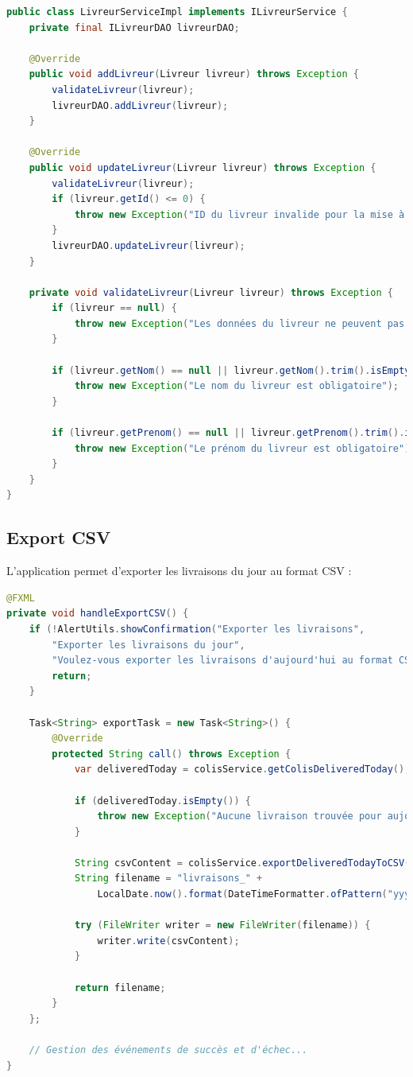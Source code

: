\documentclass{rapportENSIAS}
\begin{document}
\begin{lstlisting}[language=Java, caption=Service Livreur]
public class LivreurServiceImpl implements ILivreurService {
    private final ILivreurDAO livreurDAO;
    
    @Override
    public void addLivreur(Livreur livreur) throws Exception {
        validateLivreur(livreur);
        livreurDAO.addLivreur(livreur);
    }
    
    @Override
    public void updateLivreur(Livreur livreur) throws Exception {
        validateLivreur(livreur);
        if (livreur.getId() <= 0) {
            throw new Exception("ID du livreur invalide pour la mise à jour");
        }
        livreurDAO.updateLivreur(livreur);
    }
    
    private void validateLivreur(Livreur livreur) throws Exception {
        if (livreur == null) {
            throw new Exception("Les données du livreur ne peuvent pas être nulles");
        }
        
        if (livreur.getNom() == null || livreur.getNom().trim().isEmpty()) {
            throw new Exception("Le nom du livreur est obligatoire");
        }
        
        if (livreur.getPrenom() == null || livreur.getPrenom().trim().isEmpty()) {
            throw new Exception("Le prénom du livreur est obligatoire");
        }
    }
}
\end{lstlisting}

\subsection{Export CSV}

L'application permet d'exporter les livraisons du jour au format CSV :

\begin{lstlisting}[language=Java, caption=Export CSV]
@FXML
private void handleExportCSV() {
    if (!AlertUtils.showConfirmation("Exporter les livraisons",
        "Exporter les livraisons du jour",
        "Voulez-vous exporter les livraisons d'aujourd'hui au format CSV ?")) {
        return;
    }
    
    Task<String> exportTask = new Task<String>() {
        @Override
        protected String call() throws Exception {
            var deliveredToday = colisService.getColisDeliveredToday();
            
            if (deliveredToday.isEmpty()) {
                throw new Exception("Aucune livraison trouvée pour aujourd'hui.");
            }
            
            String csvContent = colisService.exportDeliveredTodayToCSV();
            String filename = "livraisons_" + 
                LocalDate.now().format(DateTimeFormatter.ofPattern("yyyy-MM-dd")) + ".csv";
            
            try (FileWriter writer = new FileWriter(filename)) {
                writer.write(csvContent);
            }
            
            return filename;
        }
    };
    
    // Gestion des événements de succès et d'échec...
}
\end{lstlisting}
\end{document}
